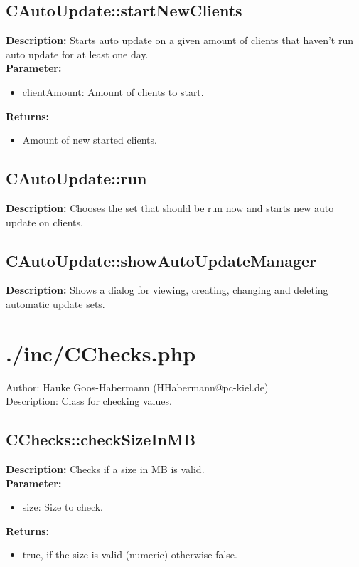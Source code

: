 \subsection{CAutoUpdate::startNewClients}
\textbf{Description:} Starts auto update on a given amount of clients that haven't run auto update for at least one day.\\
\textbf{Parameter:}
\begin{itemize}
\item clientAmount: Amount of clients to start.
\end{itemize}
\textbf{Returns:}
\begin{itemize}
\item Amount of new started clients.
\end{itemize}

\subsection{CAutoUpdate::run}
\textbf{Description:} Chooses the set that should be run now and starts new auto update on clients.\\

\subsection{CAutoUpdate::showAutoUpdateManager}
\textbf{Description:} Shows a dialog for viewing, creating, changing and deleting automatic update sets.\\

\newpage\section{./inc/CChecks.php}
 Author: Hauke Goos-Habermann (HHabermann@pc-kiel.de)\\
 Description: Class for checking values.\\

\subsection{CChecks::checkSizeInMB}
\textbf{Description:} Checks if a size in MB is valid.\\
\textbf{Parameter:}
\begin{itemize}
\item size: Size to check.
\end{itemize}
\textbf{Returns:}
\begin{itemize}
\item true, if the size is valid (numeric) otherwise false.
\end{itemize}

